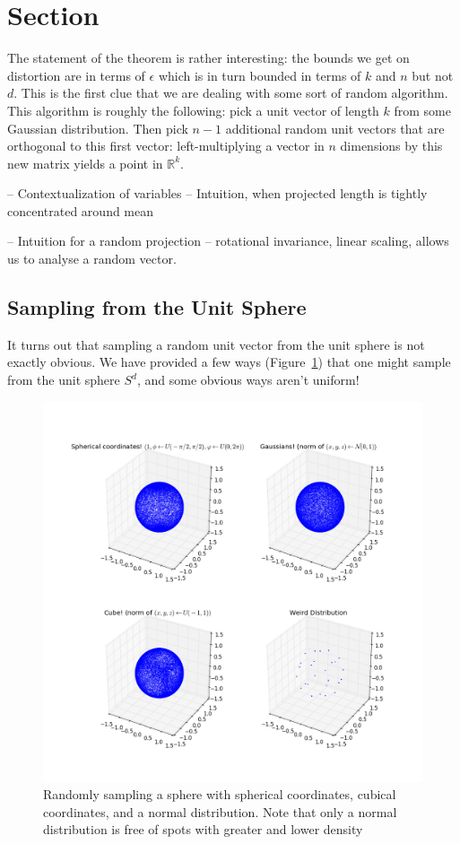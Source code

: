 \documentclass[11pt]{article}
\begin{document}
\section{Section}


The statement of the theorem is rather interesting: the bounds we get on
distortion are in terms of $\epsilon$ which is in turn bounded in terms of $k$
and $n$ but not $d$. This is the first clue that we are dealing with some sort
of random algorithm. This algorithm is roughly the following: pick a unit vector
of length $k$ from some Gaussian distribution. Then pick $n-1$ additional random
unit vectors that are orthogonal to this first vector: left-multiplying a vector
in $n$ dimensions by this new matrix yields a point in $\mathbb{R}^k$.

-- Contextualization of variables
-- Intuition, when projected length is tightly concentrated around mean

-- Intuition for a random projection
-- rotational invariance, linear scaling, allows us to analyse a random vector.

\subsection{Sampling from the Unit Sphere}
It turns out that sampling a random unit vector from the unit sphere is not exactly obvious. We have provided a few ways (Figure~\ref{fig:spheres}) that one might sample from the unit sphere $S^d$, and some obvious ways aren't uniform!

\begin{figure}
  \begin{center}
    \includegraphics[width=0.9\linewidth]{spheres.png}
  \end{center}

  \caption{Randomly sampling a sphere with spherical coordinates, cubical
    coordinates, and a normal distribution. Note that only a normal distribution
    is free of spots with greater and lower density}
  \label{fig:spheres}
\end{figure}
\end{document}
